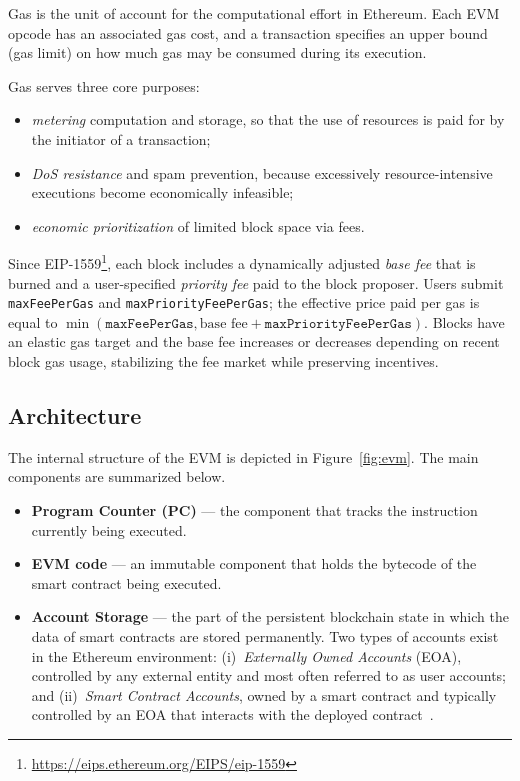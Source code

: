 Gas is the unit of account for the computational effort in Ethereum. Each EVM opcode has an associated gas cost, and a transaction specifies an upper bound (gas limit) on how much gas may be consumed during its execution.

Gas serves three core purposes:
\begin{itemize}
    \item \emph{metering} computation and storage, so that the use of resources is paid for by the initiator of a transaction;
    \item \emph{DoS resistance} and spam prevention, because excessively resource-intensive executions become economically infeasible;
    \item \emph{economic prioritization} of limited block space via fees.
\end{itemize}

Since EIP-1559\footnote{\url{https://eips.ethereum.org/EIPS/eip-1559}}, each block includes a dynamically adjusted \emph{base fee} that is burned and a user-specified \emph{priority fee} paid to the block proposer. Users submit \texttt{maxFeePerGas} and \texttt{maxPriorityFeePerGas}; the effective price paid per gas is equal to \(\min(\texttt{maxFeePerGas}, \text{base fee} + \texttt{maxPriorityFeePerGas})\). Blocks have an elastic gas target and the base fee increases or decreases depending on recent block gas usage, stabilizing the fee market while preserving incentives.

\subsection{Architecture}
\label{subsec:architecture}

The internal structure of the EVM is depicted in Figure~\ref{fig:evm}. The main components are summarized below.

\begin{itemize}
    \item \textbf{Program Counter (PC)} --- the component that tracks the instruction currently being executed.
    \item \textbf{EVM code} --- an immutable component that holds the bytecode of the smart contract being executed.
    \item \textbf{Account Storage} --- the part of the persistent blockchain state in which the data of smart contracts are stored permanently. Two types of accounts exist in the Ethereum environment: (i)~\emph{Externally Owned Accounts} (EOA), controlled by any external entity and most often referred to as user accounts; and (ii)~\emph{Smart Contract Accounts}, owned by a smart contract and typically controlled by an EOA that interacts with the deployed contract~\cite{Buterin2013}.
\end{itemize}


